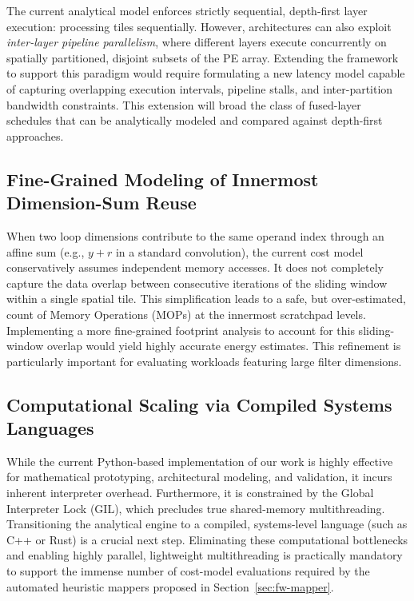 The current analytical model enforces strictly sequential, depth-first layer execution: processing tiles sequentially. However, architectures can also exploit \emph{inter-layer pipeline parallelism}, where different layers execute concurrently on spatially partitioned, disjoint subsets of the PE array. Extending the framework to support this paradigm would require formulating a new latency model capable of capturing overlapping execution intervals, pipeline stalls, and inter-partition bandwidth constraints. This extension will broad the class of fused-layer schedules that can be analytically modeled and compared against depth-first approaches.

\subsection{Fine-Grained Modeling of Innermost Dimension-Sum Reuse}
\label{sec:fw-dimsum}

When two loop dimensions contribute to the same operand index through an affine sum (e.g., $y + r$ in a standard convolution), the current cost model conservatively assumes independent memory accesses. It does not completely capture the data overlap between consecutive iterations of the sliding window within a single spatial tile. This simplification leads to a safe, but over-estimated, count of Memory Operations (MOPs) at the innermost scratchpad levels. Implementing a more fine-grained footprint analysis to account for this sliding-window overlap would yield highly accurate energy estimates. This refinement is particularly important for evaluating workloads featuring large filter dimensions.

\subsection{Computational Scaling via Compiled Systems Languages}
\label{sec:fw-compiled}

While the current Python-based implementation of our work is highly effective for mathematical prototyping, architectural modeling, and validation, it incurs inherent interpreter overhead. Furthermore, it is constrained by the Global Interpreter Lock (GIL), which precludes true shared-memory multithreading. Transitioning the analytical engine to a compiled, systems-level language (such as C++ or Rust) is a crucial next step. Eliminating these computational bottlenecks and enabling highly parallel, lightweight multithreading is practically mandatory to support the immense number of cost-model evaluations required by the automated heuristic mappers proposed in Section~\ref{sec:fw-mapper}.

